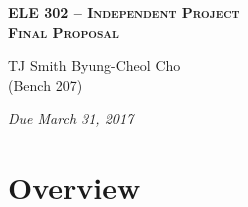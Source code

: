 \documentclass[letterpaper, 11pt]{article}
\begin{document}
    \begin{center}
        \large
        \textsc{\textbf{ELE 302 -- Independent Project \\ Final Proposal}} \vspace{5pt}

        \normalsize
        TJ Smith \hspace{1cm} Byung-Cheol Cho \\
        (Bench 207) \vspace{5pt}

        \emph{Due March 31, 2017}
        \normalsize
    \end{center}

\section{Overview}
\end{document}
